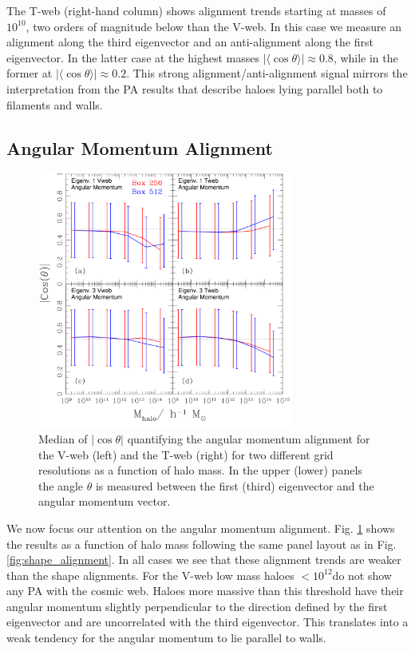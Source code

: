 \documentclass[useAMS,usenatbib]{mn2e}
\newcommand{\hMsun}{{\ifmmode{h^{-1}{\rm
        {M_{\odot}}}}\else{$h^{-1}{\rm{M_{\odot}}}$~}\fi}}
\newcommand{\muavg}{\vert\langle\cos\theta\rangle\vert}
\begin{document}
The T-web (right-hand column) shows alignment trends starting at masses of
$10^{10}$\hMsun, two orders of magnitude below than the V-web. In this
case we measure an alignment along the third eigenvector and an
anti-alignment along the first eigenvector. In the latter case at the
highest masses $\muavg\approx 0.8$, while in the former at $\muavg\approx
0.2$. This strong alignment/anti-alignment signal mirrors the
interpretation from the PA results that describe haloes lying parallel
both to filaments and walls.


\subsection{Angular Momentum Alignment}

\begin{figure}
\includegraphics[width=0.75\textwidth]{Fig3.pdf}
\caption{Median of $|\cos\theta|$ quantifying the angular momentum
  alignment for the V-web (left) and the T-web (right) for two different
  grid resolutions as a function of halo mass. In the upper (lower)
  panels the angle $\theta$ is measured between the first (third)
  eigenvector and the angular momentum
  vector.\label{fig:spin_alignment}} 
\end{figure}


We now focus our attention on the angular momentum alignment. Fig.
\ref{fig:spin_alignment} shows the results as a function of halo mass
following the same panel layout as in Fig.
\ref{fig:shape_alignment}. In all cases we see that these alignment
trends are weaker than the shape alignments. For the V-web low mass haloes
$<10^{12}$\hMsun do not show any PA with the
cosmic web. Haloes more massive than this threshold have their angular
momentum slightly perpendicular to the direction defined by the first
eigenvector and are uncorrelated with the third eigenvector. This translates
into a weak tendency for the angular momentum to lie parallel to walls.
\end{document}
